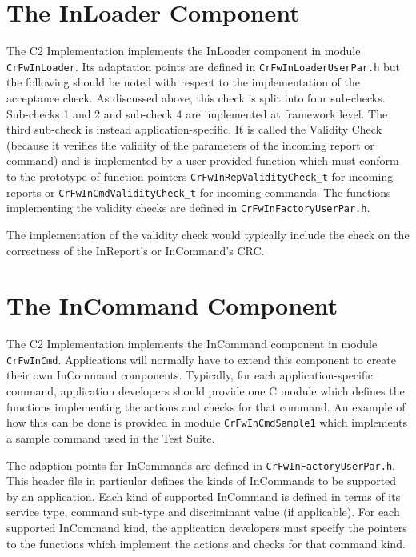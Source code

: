 \documentclass{pnp_article}
\begin{document}
\section{The InLoader Component}\label{sec:InLoader}


The C2 Implementation implements the InLoader component in module \texttt{CrFwInLoader}. Its adaptation points are defined in \texttt{CrFwInLoaderUserPar.h} but the following should be noted with respect to the implementation of the acceptance check. As discussed above, this check is split into four sub-checks. Sub-checks 1 and 2 and sub-check 4 are implemented at framework level. The third sub-check is instead application-specific. It is called the Validity Check (because it verifies the validity of the parameters of the incoming report or command) and is implemented by a user-provided function which must conform to the prototype of function pointers \texttt{CrFwInRepValidityCheck\_t} for incoming reports or \texttt{CrFwInCmdValidityCheck\_t} for incoming commands. The functions implementing the validity checks are defined in \texttt{CrFwInFactoryUserPar.h}.

The implementation of the validity check would typically include the check on the correctness of the InReport's or InCommand's CRC.

\section{The InCommand Component}\label{sec:InCommand}


The C2 Implementation implements the InCommand component in module \texttt{CrFwInCmd}. Applications will normally have to extend this component to create their own InCommand components. Typically, for each application-specific command, application developers should provide one C module which defines the functions implementing the actions and checks for that command. An example of how this can be done is provided in module \texttt{CrFwInCmdSample1} which implements a sample command used in the Test Suite.

The adaption points for InCommands are defined in \texttt{CrFwInFactoryUserPar.h}. This header file in particular defines the kinds of InCommands to be supported by an application. Each kind of supported InCommand is defined in terms of its service type, command sub-type and discriminant value (if applicable). For each supported InCommand kind, the application developers must specify the pointers to the functions which implement the actions and checks for that command kind.
\end{document}
